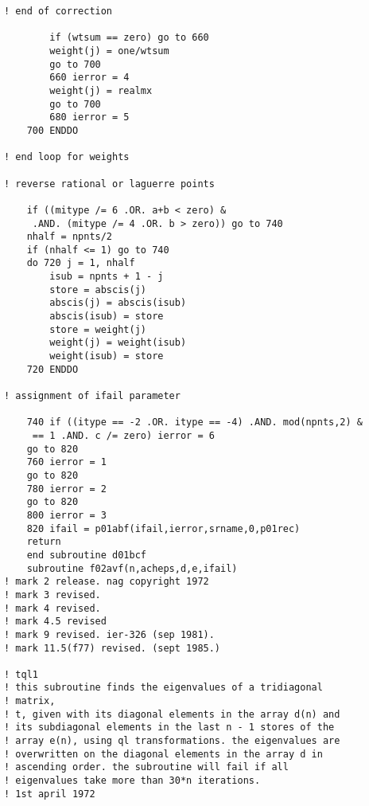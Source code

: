\documentclass[12pt]{article}
\begin{document}
\begin{lstlisting}[frame=single,caption={{\tt d01b.f90}},label=d01b]
    ! end of correction
    
        if (wtsum == zero) go to 660
        weight(j) = one/wtsum
        go to 700
        660 ierror = 4
        weight(j) = realmx
        go to 700
        680 ierror = 5
    700 ENDDO

! end loop for weights

! reverse rational or laguerre points

    if ((mitype /= 6 .OR. a+b < zero) &
     .AND. (mitype /= 4 .OR. b > zero)) go to 740
    nhalf = npnts/2
    if (nhalf <= 1) go to 740
    do 720 j = 1, nhalf
        isub = npnts + 1 - j
        store = abscis(j)
        abscis(j) = abscis(isub)
        abscis(isub) = store
        store = weight(j)
        weight(j) = weight(isub)
        weight(isub) = store
    720 ENDDO

! assignment of ifail parameter

    740 if ((itype == -2 .OR. itype == -4) .AND. mod(npnts,2) &
     == 1 .AND. c /= zero) ierror = 6
    go to 820
    760 ierror = 1
    go to 820
    780 ierror = 2
    go to 820
    800 ierror = 3
    820 ifail = p01abf(ifail,ierror,srname,0,p01rec)
    return
    end subroutine d01bcf
    subroutine f02avf(n,acheps,d,e,ifail)
! mark 2 release. nag copyright 1972
! mark 3 revised.
! mark 4 revised.
! mark 4.5 revised
! mark 9 revised. ier-326 (sep 1981).
! mark 11.5(f77) revised. (sept 1985.)

! tql1
! this subroutine finds the eigenvalues of a tridiagonal
! matrix,
! t, given with its diagonal elements in the array d(n) and
! its subdiagonal elements in the last n - 1 stores of the
! array e(n), using ql transformations. the eigenvalues are
! overwritten on the diagonal elements in the array d in
! ascending order. the subroutine will fail if all
! eigenvalues take more than 30*n iterations.
! 1st april 1972


\end{lstlisting}
\end{document}
